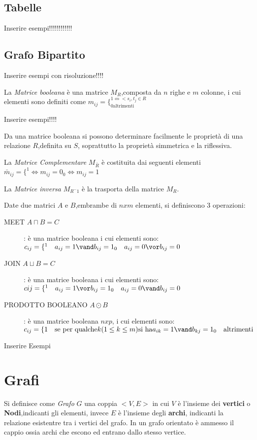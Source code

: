 \subsection{Tabelle}
Inserire esempi!!!!!!!!!!!!

\subsection{Grafo Bipartito}
Inserire esempi con risoluzione!!!!

La \emph{Matrice booleana} è una matrice $M_R$,composta da $n$ righe e $m$ colonne,
i cui elementi sono definiti come $m_{ij} = \{ ^{1 \iff <s_i,t_j \in R} _{0 \text{altrimenti}}$

Inserire esempi!!!!

Da una matrice booleana si possono determinare facilmente le proprietà
di una relazione $R$,definita su $S$, soprattutto la proprietà simmetrica e la riflessiva.

La \emph{Matrice Complementare} $M_{\bar{R}}$ è costituita dai seguenti elementi
$\bar{m}_{ij} = \{ ^ 1 \iff m_{ij} = 0 _ 0 \iff m_{ij} = 1$

La \emph{Matrice inversa} $M_{R ^-1}$ è la trasporta della matrice $M_R$.

Date due matrici $A$ e $B$,embrambe di $n x m$ elementi, si definiscono 3 operazioni:
\begin{description}
    \item[MEET $A \sqcap B = C$]: è una matrice booleana i cui elementi sono:
    $c_{ij} = \{ ^ 1 \quad a_{ij} = 1 \vand b_{ij} = 1 _ 0 \quad a_{ij} = 0 \vor b_{ij} = 0$
    \item[JOIN $A \sqcup B = C$]: è una matrice booleana i cui elementi sono:
    $c{ij} = \{ ^ 1 \quad a_{ij} = 1 \vor b_{ij} = 1 _ 0 \quad a_{ij} = 0 \vand b_{ij} = 0$
    \item[PRODOTTO BOOLEANO $A \odot B$]: è una matrice booleana $n x p$, i cui elementi sono:
    $c_{ij} = \{1 \quad \text{se per qualche} k(1 \leq k \leq m) \text{si ha} a_{ik} = 1 \vand b_{kj} = 1
    _ 0 \quad \text{altrimenti}$
\end{description}

Inserire Esempi

\section{Grafi}
Si definisce come \emph{Grafo} $G$ una coppia $<V,E>$ in cui $V$ è l'insieme
dei \textbf{vertici} o \textbf{Nodi},indicanti gli elementi, invece $E$
 è l'insieme degli \textbf{archi}, indicanti la relazione esistentre tra i vertici del grafo.\newline
In un grafo orientato è ammesso il cappio ossia archi che escono ed entrano dallo stesso vertice.

